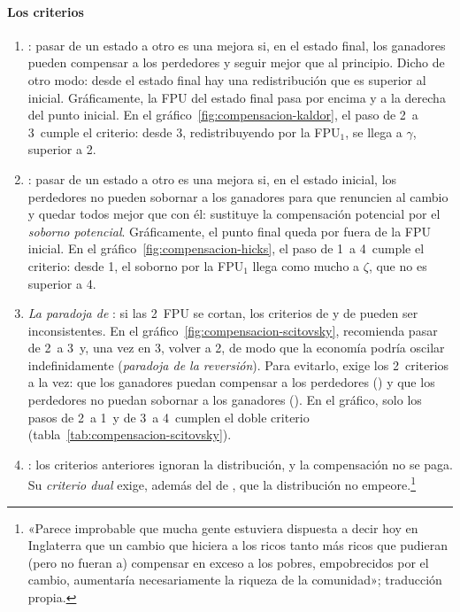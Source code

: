 \documentclass[11pt]{article}
\begin{document}
\paragraph{Los criterios}

\begin{enumerate}
\item \emph{}\nocite{Kaldor1939Welfare}: pasar de un estado a otro es una mejora si, en el estado final, los ganadores pueden compensar a los perdedores y seguir mejor que al principio. Dicho de otro modo: desde el estado final hay una redistribución que es  superior al inicial. Gráficamente, la FPU del estado final pasa por encima y a la derecha del punto inicial. En el gráfico~\ref{fig:compensacion-kaldor}, el paso de 2~a 3~cumple el criterio: desde 3, redistribuyendo por la FPU$_1$, se llega a $\gamma$,  superior a 2.
\item \emph{}\nocite{Hicks1939Foundations}: pasar de un estado a otro es una mejora si, en el estado inicial, los perdedores no pueden sobornar a los ganadores para que renuncien al cambio y quedar todos mejor que con él: sustituye la compensación potencial por el \emph{soborno potencial}. Gráficamente, el punto final queda por fuera de la FPU inicial. En el gráfico~\ref{fig:compensacion-hicks}, el paso de 1~a 4~cumple el criterio: desde 1, el soborno por la FPU$_1$ llega como mucho a $\zeta$, que no es  superior a 4.
\item \emph{La paradoja de }\nocite{Scitovsky1941Note}: si las 2~FPU se cortan, los criterios de  y de  pueden ser inconsistentes. En el gráfico~\ref{fig:compensacion-scitovsky},  recomienda pasar de 2~a 3~y, una vez en 3, volver a 2, de modo que la economía podría oscilar indefinidamente (\emph{paradoja de la reversión}). Para evitarlo,  exige los 2~criterios a la vez: que los ganadores puedan compensar a los perdedores () y que los perdedores no puedan sobornar a los ganadores (). En el gráfico, solo los pasos de 2~a 1~y de 3~a 4~cumplen el doble criterio (tabla~\ref{tab:compensacion-scitovsky}).
\item \emph{}\nocite{Little1949Foundations,Little1950Critique}: los criterios anteriores ignoran la distribución, y la compensación no se paga. Su \emph{criterio dual} exige, además del de , que la distribución no empeore.\footnote{«Parece improbable que mucha gente estuviera dispuesta a decir hoy en Inglaterra que un cambio que hiciera a los ricos tanto más ricos que pudieran (pero no fueran a) compensar en exceso a los pobres, empobrecidos por el cambio, aumentaría necesariamente la riqueza de la comunidad»\nocite{Little1950Critique}; traducción propia.}

\end{enumerate}
\end{document}
